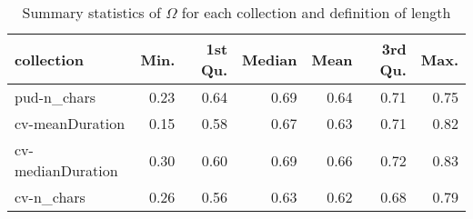 \begin{table}[H]
\centering
\caption{Summary statistics of $\Omega$ for each collection and definition of length} 
\label{tab:opt_scores_summary}
\begin{tabular}{lrrrrrr}
  \hline
collection & Min. & 1st Qu. & Median & Mean & 3rd Qu. & Max. \\ 
  \hline
pud-n_chars & 0.23 & 0.64 & 0.69 & 0.64 & 0.71 & 0.75 \\ 
  cv-meanDuration & 0.15 & 0.58 & 0.67 & 0.63 & 0.71 & 0.82 \\ 
  cv-medianDuration & 0.30 & 0.60 & 0.69 & 0.66 & 0.72 & 0.83 \\ 
  cv-n_chars & 0.26 & 0.56 & 0.63 & 0.62 & 0.68 & 0.79 \\ 
   \hline
\end{tabular}
\end{table}
